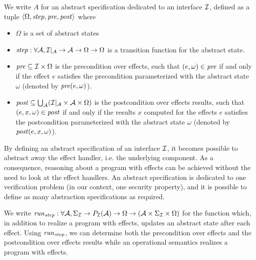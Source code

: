 \begin{definition} \label{def:freespec:abstract-specs}
  We write $A$ for an abstract specification dedicated to an interface $\mathcal{I}$,
  defined as a tuple
  $\langle \Omega, \mathit{step}, \mathit{pre}, \mathit{post} \rangle$ where
  \begin{itemize}
  \item $\Omega$ is a set of abstract states
  \item
    $\mathit{step} : \forall \mathcal{A}, \mathcal{I}|_{\mathcal{A}} \rightarrow
    \mathcal{A} \rightarrow \Omega \rightarrow \Omega$ is a transition function
    for the abstract state.
  \item $\mathit{pre} \subseteq \mathcal{I} \times \Omega$ is the precondition over
    effects, such that $(e, \omega) \in \mathit{pre}$ if and only if the effect
    $e$ satisfies the precondition parameterized with the abstract state
    $\omega$ (denoted by $\mathit{pre}(e, \omega)$).
  \item
    $\mathit{post} \subseteq \bigcup_{\mathcal{A}} (\mathcal{I}|_{\mathcal{A}}
    \times \mathcal{A} \times \Omega)$ is the postcondition over effects
    results, such that $(e, x, \omega) \in \mathit{post}$ if and only if the
    results $x$ computed for the effects $e$ satisfies the postcondition
    parameterized with the abstract state $\omega$ (denoted by
    $\mathit{post}(e, x, \omega)$).
  \end{itemize}
\end{definition}

By defining an abstract specification of an interface $\mathcal{I}$, it becomes possible
to abstract away the effect handler, i.e. the underlying component.
%
As a consequence, reasoning about a program with effects can be achieved without
the need to look at the effect handlers.
%
An abstract specification is dedicated to one verification problem (in our
context, one security property), and it is possible to define as many
abstraction specifications as required.

We write
$\mathit{run}_{\mathit{step}} : \forall \mathcal{A}, \Sigma_{\mathcal{I}} \rightarrow
P_{\mathcal{I}}(\mathcal{A}) \rightarrow \Omega \rightarrow (\mathcal{A} \times
\Sigma_{\mathcal{I}} \times \Omega)$ for the function which, in addition to realize a
program with effects, updates an abstract state after each effect.
%
Using $\mathit{run}_{\mathit{step}}$, we can determine both the precondition over
effects and the postcondition over effects results while an operational
semantics realizes a program with effects.

